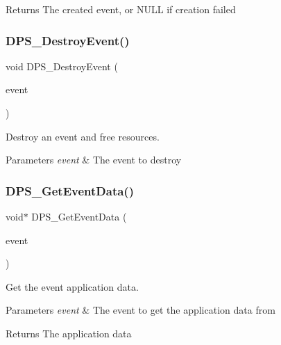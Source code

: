 \begin{DoxyReturn}{Returns}
The created event, or N\+U\+LL if creation failed 
\end{DoxyReturn}
\mbox{\label{group__event_ga7539f700336357cd320d6b40eba59c63}} 
\subsubsection{\texorpdfstring{D\+P\+S\+\_\+\+Destroy\+Event()}{DPS\_DestroyEvent()}}
{\footnotesize\ttfamily void D\+P\+S\+\_\+\+Destroy\+Event (\begin{DoxyParamCaption}\item[{\hyperlink{group__event_ga97617da1bac0e76646713b8665dfdd85}{D\+P\+S\+\_\+\+Event} $\ast$}]{event }\end{DoxyParamCaption})}



Destroy an event and free resources. 


\begin{DoxyParams}{Parameters}
{\em event} & The event to destroy \\
\hline
\end{DoxyParams}
\mbox{\label{group__event_gaba8fce0d0896df9b6f294112a251e39f}} 
\subsubsection{\texorpdfstring{D\+P\+S\+\_\+\+Get\+Event\+Data()}{DPS\_GetEventData()}}
{\footnotesize\ttfamily void$\ast$ D\+P\+S\+\_\+\+Get\+Event\+Data (\begin{DoxyParamCaption}\item[{const \hyperlink{group__event_ga97617da1bac0e76646713b8665dfdd85}{D\+P\+S\+\_\+\+Event} $\ast$}]{event }\end{DoxyParamCaption})}



Get the event application data. 


\begin{DoxyParams}{Parameters}
{\em event} & The event to get the application data from\\
\hline
\end{DoxyParams}
\begin{DoxyReturn}{Returns}
The application data 
\end{DoxyReturn}
\mbox{\label{group__event_ga23a814c5aaebf5bdddebac0ef5d295ce}} 
